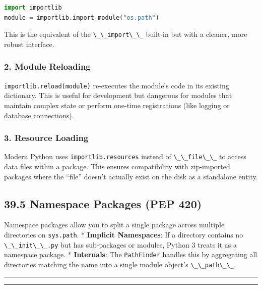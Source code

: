 \begin{lstlisting}[language=Python]
import importlib
module = importlib.import_module("os.path")
\end{lstlisting}

This is the equivalent of the \passthrough{\lstinline!\_\_import\_\_!}
built-in but with a cleaner, more robust interface.

\hypertarget{module-reloading}{%
\subsubsection{2. Module Reloading}\label{module-reloading}}

\passthrough{\lstinline!importlib.reload(module)!} re-executes the
module's code in its existing dictionary. This is useful for development
but dangerous for modules that maintain complex state or perform
one-time registrations (like logging or database connections).

\hypertarget{resource-loading}{%
\subsubsection{3. Resource Loading}\label{resource-loading}}

Modern Python uses \passthrough{\lstinline!importlib.resources!} instead
of \passthrough{\lstinline!\_\_file\_\_!} to access data files within a
package. This ensures compatibility with zip-imported packages where the
``file'' doesn't actually exist on the disk as a standalone entity.

\hypertarget{namespace-packages-pep-420}{%
\subsection{39.5 Namespace Packages (PEP
420)}\label{namespace-packages-pep-420}}

Namespace packages allow you to split a single package across multiple
directories on \passthrough{\lstinline!sys.path!}. * \textbf{Implicit
Namespaces}: If a directory contains no
\passthrough{\lstinline!\_\_init\_\_.py!} but has sub-packages or
modules, Python 3 treats it as a namespace package. *
\textbf{Internals}: The \passthrough{\lstinline!PathFinder!} handles
this by aggregating all directories matching the name into a single
module object's \passthrough{\lstinline!\_\_path\_\_!}.

\begin{center}\rule{0.5\linewidth}{0.5pt}\end{center}

\begin{center}\rule{0.5\linewidth}{0.5pt}\end{center}
